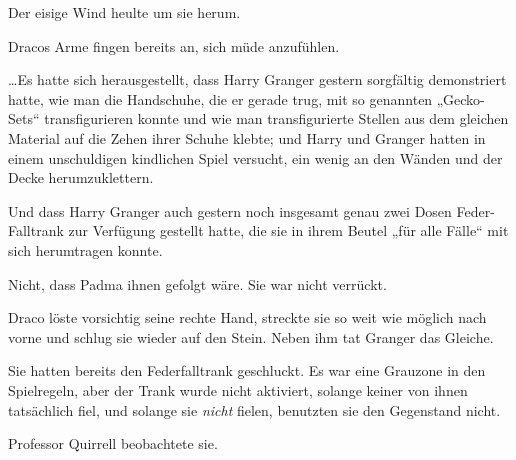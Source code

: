 \later

Der eisige Wind heulte um sie herum.

Dracos Arme fingen bereits an, sich müde anzufühlen.

…Es hatte sich herausgestellt, dass Harry Granger gestern sorgfältig demonstriert hatte, wie man die Handschuhe, die er gerade trug, mit so genannten „Gecko-Sets“ transfigurieren konnte und wie man transfigurierte Stellen aus dem gleichen Material auf die Zehen ihrer Schuhe klebte; und Harry und Granger hatten in einem unschuldigen kindlichen Spiel versucht, ein wenig an den Wänden und der Decke herumzuklettern.

Und dass Harry Granger auch gestern noch insgesamt genau zwei Dosen Feder-Falltrank zur Verfügung gestellt hatte, die sie in ihrem Beutel „für alle Fälle“ mit sich herumtragen konnte.

Nicht, dass Padma ihnen gefolgt wäre. Sie war nicht verrückt.

Draco löste vorsichtig seine rechte Hand, streckte sie so weit wie möglich nach vorne und schlug sie wieder auf den Stein. Neben ihm tat Granger das Gleiche.

Sie hatten bereits den Federfalltrank geschluckt. Es war eine Grauzone in den Spielregeln, aber der Trank wurde nicht aktiviert, solange keiner von ihnen tatsächlich fiel, und solange sie \emph{nicht} fielen, benutzten sie den Gegenstand nicht.

Professor Quirrell beobachtete sie.

